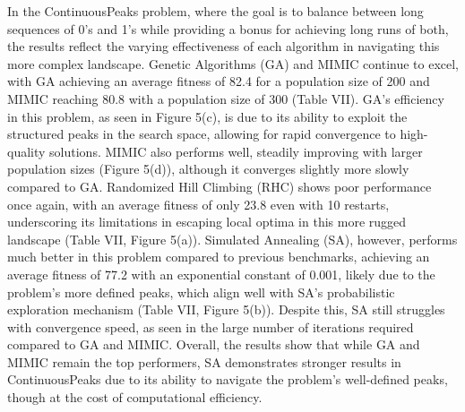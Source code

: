 In the ContinuousPeaks problem, where the goal is to balance between long sequences of 0’s and 1’s while providing a bonus for achieving long runs of both, the results reflect the varying effectiveness of each algorithm in navigating this more complex landscape. Genetic Algorithms (GA) and MIMIC continue to excel, with GA achieving an average fitness of 82.4 for a population size of 200 and MIMIC reaching 80.8 with a population size of 300 (Table VII). GA’s efficiency in this problem, as seen in Figure 5(c), is due to its ability to exploit the structured peaks in the search space, allowing for rapid convergence to high-quality solutions. MIMIC also performs well, steadily improving with larger population sizes (Figure 5(d)), although it converges slightly more slowly compared to GA. Randomized Hill Climbing (RHC) shows poor performance once again, with an average fitness of only 23.8 even with 10 restarts, underscoring its limitations in escaping local optima in this more rugged landscape (Table VII, Figure 5(a)). Simulated Annealing (SA), however, performs much better in this problem compared to previous benchmarks, achieving an average fitness of 77.2 with an exponential constant of 0.001, likely due to the problem’s more defined peaks, which align well with SA's probabilistic exploration mechanism (Table VII, Figure 5(b)). Despite this, SA still struggles with convergence speed, as seen in the large number of iterations required compared to GA and MIMIC. Overall, the results show that while GA and MIMIC remain the top performers, SA demonstrates stronger results in ContinuousPeaks due to its ability to navigate the problem’s well-defined peaks, though at the cost of computational efficiency.
